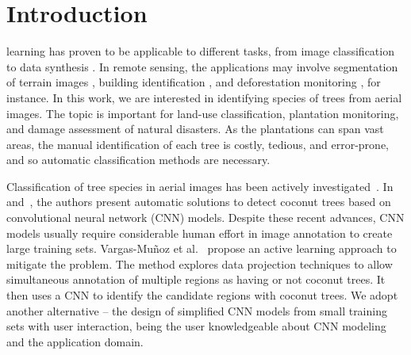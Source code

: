 \documentclass[journal, twoside]{IEEEtran}
\begin{document}
\section{Introduction}
 learning has proven to be applicable to different tasks, from image classification to data synthesis \cite{goodfellow2016deep}. In remote sensing, the applications may involve segmentation of terrain images \cite{kemker2018algorithms, kampffmeyer2016semantic}, building identification \cite{xu2018building, lu2018detecting, liu2018multilevel}, and deforestation monitoring \cite{bragilevsky2017deep}, for instance. In this work, we are interested in identifying species of trees from aerial images. The topic is important for land-use classification, plantation monitoring, and damage assessment of natural disasters. As the plantations can span vast areas, the manual identification of each tree is costly, tedious, and error-prone, and so automatic classification methods are necessary. 

Classification of tree species in aerial images has been actively investigated~\cite{fassnacht2016review}. In \cite{puttemans2018comparing} and~\cite{aparna2018cnn}, the authors present automatic solutions to detect coconut trees based on convolutional neural network (CNN) models. Despite these recent advances, CNN models usually require considerable human effort in image annotation to create large training sets. Vargas-Muñoz et al.~\cite{8899005} propose an active learning approach to mitigate the problem. The method explores data projection techniques to allow simultaneous annotation of multiple regions as having or not coconut trees. It then uses a CNN to identify the candidate regions with coconut trees. We adopt another alternative -- the design of simplified CNN models from small training sets with user interaction, being the user knowledgeable about CNN modeling and the application domain.
\end{document}

